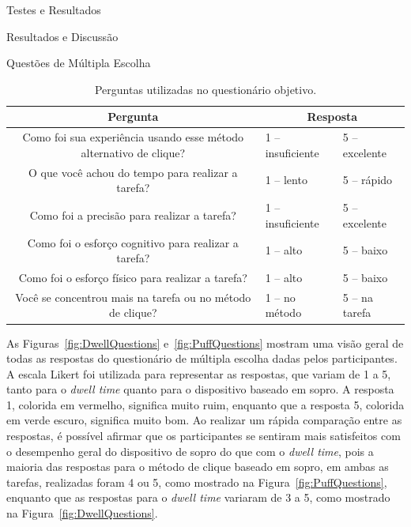 \begin{chapter}{Testes e Resultados}
\begin{section}{Resultados e Discussão}
\begin{subsection}{Questões de Múltipla Escolha}
\begin{table}[!h]
\centering
\small
\def\arraystretch{1.0}
\begin{tabular}{c|ll}
	\hline
	\hline
	 \textbf{Pergunta} &\multicolumn{2}{c}{\textbf{Resposta}} \\
	\hline
	 Como foi sua experiência usando esse método alternativo de clique? & 1 -- insuficiente        & 5 -- excelente   \\
	 O que você achou do tempo para realizar a tarefa?                  & 1 -- lento               & 5 -- rápido      \\
	 Como foi a precisão para realizar a tarefa?                        & 1 -- insuficiente        & 5 -- excelente   \\
	 Como foi o esforço cognitivo para realizar a tarefa?               & 1 -- alto                & 5 -- baixo       \\
	 Como foi o esforço físico para realizar a tarefa?                  & 1 -- alto                & 5 -- baixo       \\
	 Você se concentrou mais na tarefa ou no método de clique?          & 1 -- no método           & 5 -- na tarefa   \\
	\hline
	\hline
\end{tabular}
\caption{Perguntas utilizadas no questionário objetivo.}
\label{tab:quest}
\end{table}

As Figuras~\ref{fig:DwellQuestions} e~\ref{fig:PuffQuestions} mostram uma visão
geral de todas as respostas do questionário de múltipla escolha dadas pelos
participantes. A escala Likert foi utilizada para representar as respostas, que
variam de 1 a 5, tanto para o \textit{dwell time} quanto para o dispositivo
baseado em sopro.  A resposta 1, colorida em vermelho, significa muito ruim,
enquanto que a resposta 5, colorida em verde escuro, significa muito bom. Ao
realizar um rápida comparação entre as respostas, é possível afirmar que os
participantes se sentiram mais satisfeitos com o desempenho geral do dispositivo
de sopro do que com o \textit{dwell time}, pois a maioria das respostas
para o método de clique baseado em sopro, em ambas as tarefas, realizadas foram 4
ou 5, como mostrado na Figura~\ref{fig:PuffQuestions}, enquanto que as respostas
para o \textit{dwell time} variaram de 3 a 5, como mostrado na
Figura~\ref{fig:DwellQuestions}.  


\end{subsection}
\end{section}
\end{chapter}
